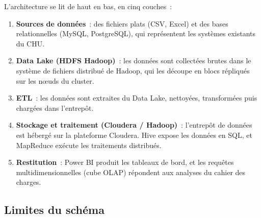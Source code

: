 \noindent L'architecture se lit de haut en bas, en cinq couches~:
\begin{enumerate}
	\item \textbf{Sources de données}~: des fichiers plats (CSV, Excel) et des bases relationnelles (MySQL, PostgreSQL), qui représentent les systèmes existants du CHU.
	\item \textbf{Data Lake (HDFS Hadoop)}~: les données sont collectées brutes dans le système de fichiers distribué de Hadoop, qui les découpe en blocs répliqués sur les nœuds du cluster.
	\item \textbf{ETL}~: les données sont extraites du Data Lake, nettoyées, transformées puis chargées dans l'entrepôt.
	\item \textbf{Stockage et traitement (Cloudera / Hadoop)}~: l'entrepôt de données est hébergé sur la plateforme Cloudera. Hive expose les données en SQL, et MapReduce exécute les traitements distribués.
	\item \textbf{Restitution}~: Power BI produit les tableaux de bord, et les requêtes multidimensionnelles (cube OLAP) répondent aux analyses du cahier des charges.
\end{enumerate}

\subsection{Limites du schéma}


